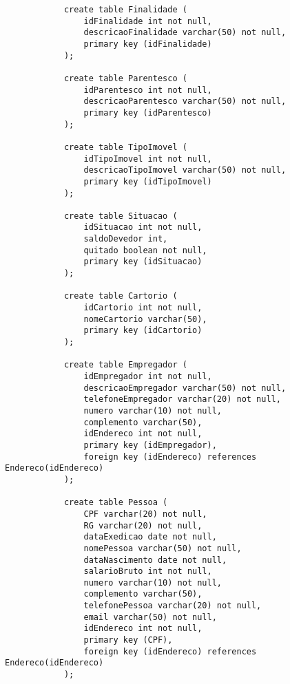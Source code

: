 \documentclass{article}
\begin{document}
\begin{lstlisting}
            create table Finalidade (
            	idFinalidade int not null,
            	descricaoFinalidade varchar(50) not null,
            	primary key (idFinalidade)
            );
            
            create table Parentesco (
            	idParentesco int not null,
            	descricaoParentesco varchar(50) not null,
            	primary key (idParentesco)
            );
            
            create table TipoImovel (
            	idTipoImovel int not null,
            	descricaoTipoImovel varchar(50) not null,
            	primary key (idTipoImovel)
            );
            
            create table Situacao (
            	idSituacao int not null,
            	saldoDevedor int,
            	quitado boolean not null,
            	primary key (idSituacao)
            );
            
            create table Cartorio (
            	idCartorio int not null,
            	nomeCartorio varchar(50),
            	primary key (idCartorio)
            );
            
            create table Empregador (
            	idEmpregador int not null,
            	descricaoEmpregador varchar(50) not null,
            	telefoneEmpregador varchar(20) not null,
            	numero varchar(10) not null,
            	complemento varchar(50),
            	idEndereco int not null,
            	primary key (idEmpregador),
            	foreign key (idEndereco) references Endereco(idEndereco)
            );
            
            create table Pessoa (
            	CPF varchar(20) not null,
            	RG varchar(20) not null,
            	dataExedicao date not null,
            	nomePessoa varchar(50) not null,
            	dataNascimento date not null,
            	salarioBruto int not null, 
            	numero varchar(10) not null,
            	complemento varchar(50),
            	telefonePessoa varchar(20) not null,
            	email varchar(50) not null,
            	idEndereco int not null,
            	primary key (CPF),
            	foreign key (idEndereco) references Endereco(idEndereco)
            );
            

\end{lstlisting}
\end{document}
